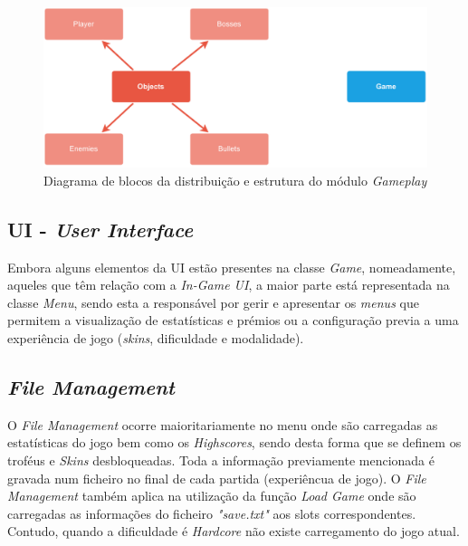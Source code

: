 \documentclass[a4paper,11pt]{article}
\begin{document}
\vspace{8pt}

\begin{figure}[H]
    \centering
    \includegraphics[scale = 0.50]{2 - Esquemas/ClassGameplay.pdf}
    \caption{Diagrama de blocos da distribuição e estrutura do módulo \textit{Gameplay}}
    \label{fig:ClassGameplay}
\end{figure}

\vspace{8pt}

\subsection*{UI - \textit{User Interface}}

\vspace{8pt}

Embora alguns elementos da UI estão presentes na classe \textit{Game}, nomeadamente, aqueles que têm relação com a \textit{In-Game UI}, a maior parte está representada na classe \textit{Menu}, sendo esta a responsável por gerir e apresentar os \textit{menus} que permitem a visualização de estatísticas e prémios ou a configuração previa a uma experiência de jogo (\textit{skins}, dificuldade e modalidade).


\vspace{8pt}

\subsection*{\textit{File Management}}
O \textit{File Management} ocorre maioritariamente no menu onde são carregadas as estatísticas do jogo bem como os \textit{Highscores}, sendo desta forma que se definem os troféus e \textit{Skins} desbloqueadas. Toda a informação previamente mencionada é gravada num ficheiro no final de cada partida (experiêncua de jogo). O \textit{File Management} também aplica na utilização da função  \textit{Load Game} onde são carregadas as informações do ficheiro \textit{"save.txt"} aos slots correspondentes. Contudo, quando a dificuldade é \textit{Hardcore} não existe carregamento do jogo atual.
\end{document}
